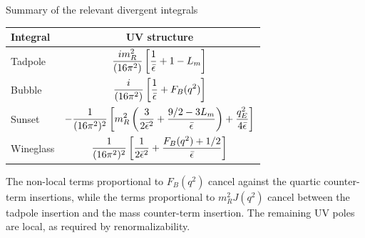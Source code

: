\documentclass[aspectratio=169,10pt]{beamer}
\begin{document}

    




\begin{frame}{Summary of the relevant divergent integrals}

\small

\begin{center}
\renewcommand{\arraystretch}{1.35}
\begin{tabular}{lc}
\toprule
Integral & UV structure \\
\midrule

Tadpole
&
$\displaystyle
\frac{i m_R^2}{(16\pi^2)}
\left[
\frac1{\bar\epsilon}
+
1-L_m
\right]
$
\\

Bubble
&
$\displaystyle
\frac{i}{(16\pi^2)}
\left[
\frac1{\bar\epsilon}
+
F_B(q^2)
\right]
$
\\

Sunset
&
$\displaystyle
-\frac1{(16\pi^2)^2}
\left[
m_R^2
\left(
\frac3{2\bar\epsilon^2}
+
\frac{9/2-3L_m}{\bar\epsilon}
\right)
+
\frac{q_E^2}{4\bar\epsilon}
\right]
$
\\

Wineglass
&
$\displaystyle
\frac1{(16\pi^2)^2}
\left[
\frac1{2\bar\epsilon^2}
+
\frac{F_B(q^2)+1/2}{\bar\epsilon}
\right]
$
\\

\bottomrule
\end{tabular}
\end{center}

\vspace{0.3cm}

The non-local terms proportional to $F_B(q^2)$ cancel against
the quartic counter-term insertions, while the terms proportional
to $m_R^2J(q^2)$ cancel between the tadpole insertion and the
mass counter-term insertion. The remaining UV poles are local,
as required by renormalizability.

\end{frame}
\end{document}
